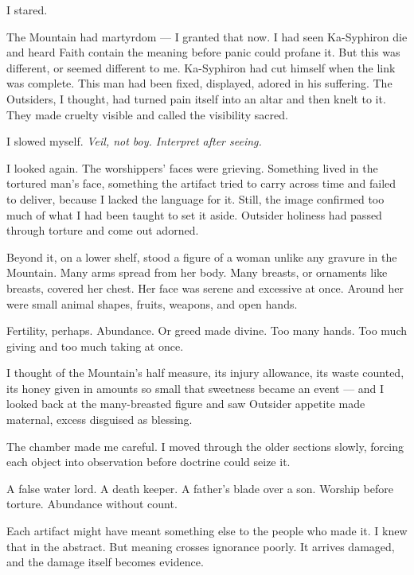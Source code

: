 I stared.\par

The Mountain had martyrdom --- I granted that now. I had seen Ka-Syphiron die and heard Faith contain the meaning before panic could profane it. But this was different, or seemed different to me. Ka-Syphiron had cut himself when the link was complete. This man had been fixed, displayed, adored in his suffering. The Outsiders, I thought, had turned pain itself into an altar and then knelt to it. They made cruelty visible and called the visibility sacred.\par

I slowed myself. \textit{Veil, not boy. Interpret after seeing.}\par

I looked again. The worshippers' faces were grieving. Something lived in the tortured man's face, something the artifact tried to carry across time and failed to deliver, because I lacked the language for it. Still, the image confirmed too much of what I had been taught to set it aside. Outsider holiness had passed through torture and come out adorned.\par

Beyond it, on a lower shelf, stood a figure of a woman unlike any gravure in the Mountain. Many arms spread from her body. Many breasts, or ornaments like breasts, covered her chest. Her face was serene and excessive at once. Around her were small animal shapes, fruits, weapons, and open hands.\par

Fertility, perhaps. Abundance. Or greed made divine. Too many hands. Too much giving and too much taking at once.\par

I thought of the Mountain's half measure, its injury allowance, its waste counted, its honey given in amounts so small that sweetness became an event --- and I looked back at the many-breasted figure and saw Outsider appetite made maternal, excess disguised as blessing.\par

The chamber made me careful. I moved through the older sections slowly, forcing each object into observation before doctrine could seize it.\par

A false water lord. A death keeper. A father's blade over a son. Worship before torture. Abundance without count.\par

Each artifact might have meant something else to the people who made it. I knew that in the abstract. But meaning crosses ignorance poorly. It arrives damaged, and the damage itself becomes evidence.\par

